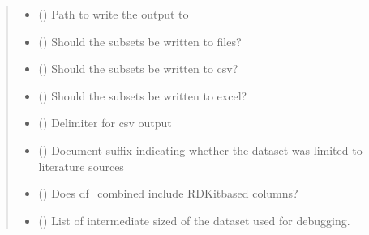 \documentclass[letterpaper,10pt,english]{sphinxmanual}
\begin{document}
\begin{fulllineitems}
\begin{quote}
\begin{description}
\begin{itemize}
\item {} 
\sphinxAtStartPar
{} () \textendash{} Path to write the output to

\item {} 
\sphinxAtStartPar
{} () \textendash{} Should the subsets be written to files?

\item {} 
\sphinxAtStartPar
{} () \textendash{} Should the subsets be written to csv?

\item {} 
\sphinxAtStartPar
{} () \textendash{} Should the subsets be written to excel?

\item {} 
\sphinxAtStartPar
{} () \textendash{} Delimiter for csv output

\item {} 
\sphinxAtStartPar
{} () \textendash{} Document suffix indicating whether the dataset was limited to literature sources

\item {} 
\sphinxAtStartPar
{} () \textendash{} Does df\_combined include RDKit\sphinxhyphen{}based columns?

\item {} 
\sphinxAtStartPar
{} (\sphinxstyleliteralemphasis{\sphinxupquote{{[}}}\sphinxstyleliteralemphasis{\sphinxupquote{{[}}}\sphinxstyleliteralemphasis{\sphinxupquote{{]}}}\sphinxstyleliteralemphasis{\sphinxupquote{, }}\sphinxstyleliteralemphasis{\sphinxupquote{{[}}}\sphinxstyleliteralemphasis{\sphinxupquote{{]}}}\sphinxstyleliteralemphasis{\sphinxupquote{{]}}}) \textendash{} List of intermediate sized of the dataset used for debugging.


\end{itemize}
\end{description}
\end{quote}
\end{fulllineitems}
\end{document}
